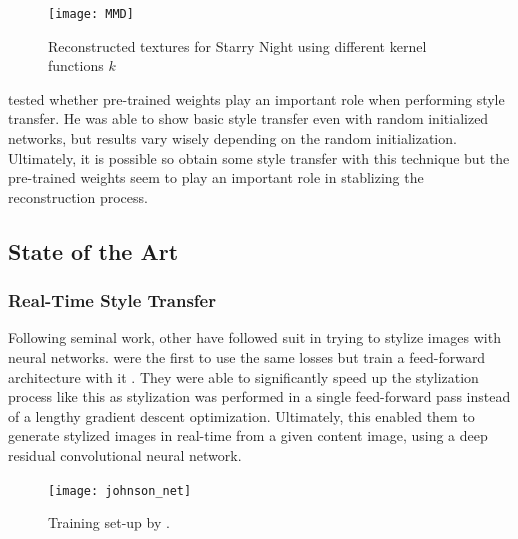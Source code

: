 \begin{figure}
    \texttt{[image: MMD]}
    \caption[]{Reconstructed textures for Starry Night using different kernel functions $k$ \cite{MMD}}
\end{figure}


\citeauthor*{LenDu} tested whether pre-trained weights play an important role when performing style transfer.
He was able to show basic style transfer even with random initialized networks, but results vary wisely depending on the random initialization.
Ultimately, it is possible so obtain some style transfer with this technique but the pre-trained weights seem to play an important role in stablizing the reconstruction process.

\subsection{State of the Art}

\subsubsection{Real-Time Style Transfer}
Following \citeauthor*{gatys} seminal work, other have followed suit in trying to stylize images with neural networks.
\citeauthor*{Johnson} were the first to use the same losses but train a feed-forward architecture with it \cite{johnson}.
They were able to significantly speed up the stylization process like this as stylization was performed in a single feed-forward pass instead of a lengthy gradient descent optimization.
Ultimately, this enabled them to generate stylized images in real-time from a given content image, using a deep residual convolutional neural network.
\begin{figure}
    \texttt{[image: johnson\_net]}
    \caption[]{Training set-up by \citeauthor*{johnson}. \cite{johnson}}
\end{figure}


